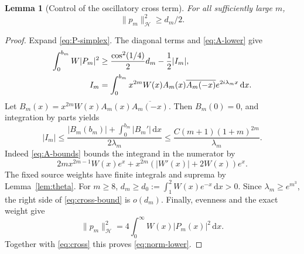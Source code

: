 \documentclass[11pt,a4paper]{article}
\newcommand{\HH}{\mathcal H}
\newcommand{\norm}[1]{\lVert #1\rVert}
\newcommand{\abs}[1]{\lvert #1\rvert}
\newcommand{\dd}{\,\mathrm d}
\newtheorem{lemma}[theorem]{Lemma}
\theoremstyle{definition}
\theoremstyle{remark}
\numberwithin{equation}{section}
\begin{document}
\begin{lemma}[Control of the oscillatory cross term]\label{lem:norm}
For all sufficiently large $m$,
\begin{equation}\label{eq:norm-lower}
 \norm{p_m}_{\HH}^2\ge d_m/2.
\end{equation}
\end{lemma}
\begin{proof}
Expand \eqref{eq:P-simplex}. The diagonal terms and
\eqref{eq:A-lower} give
\begin{align}\label{eq:cross}
 \int_0^{b_m}W\abs{P_m}^2
 &\ge\frac{\cos^2(1/4)}2d_m-\frac12\abs{I_m},\notag\\
 I_m&=\int_0^{b_m}x^{2m}W(x)A_m(x)\overline{A_m(-x)}
                                  e^{2i\lambda_mx}\dd x.
\end{align}
Let $B_m(x)=x^{2m}W(x)A_m(x)\overline{A_m(-x)}$. Then $B_m(0)=0$,
and integration by parts yields
\begin{equation}\label{eq:cross-bound}
 \abs{I_m}\le
 \frac{\abs{B_m(b_m)}+\int_0^{b_m}\abs{B_m'}\dd x}{2\lambda_m}
 \le\frac{C(m+1)(1+m)^{2m}}{\lambda_m}.
\end{equation}
Indeed \eqref{eq:A-bounds} bounds the integrand in the numerator by
\[
 2m x^{2m-1}W(x)e^x+x^{2m}(|W'(x)|+2W(x))e^x.
\]
The fixed source weights have finite integrals and suprema by
Lemma~\ref{lem:theta}. For $m\ge8$,
$d_m\ge d_0:=\int_1^2W(x)e^{-x}\dd x>0$.
Since $\lambda_m\ge e^{m^3}$, the right side of
\eqref{eq:cross-bound} is $o(d_m)$. Finally, evenness and the exact
weight give
\[
 \norm{p_m}_{\HH}^2=4\int_0^\infty W(x)\abs{P_m(x)}^2\dd x.
\]
Together with \eqref{eq:cross} this proves \eqref{eq:norm-lower}.
\end{proof}
\end{document}
